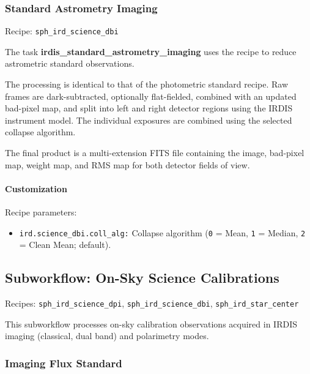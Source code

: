 \subsubsection{Standard Astrometry Imaging}

Recipe: \texttt{sph\_ird\_science\_dbi}

The task \textbf{irdis\_standard\_astrometry\_imaging} uses the recipe to reduce astrometric standard observations.

The processing is identical to that of the photometric standard recipe. Raw
frames are dark-subtracted, optionally flat-fielded, combined with an updated
bad-pixel map, and split into left and right detector regions using the IRDIS
instrument model. The individual exposures are combined using the selected
collapse algorithm.

The final product is a multi-extension FITS file containing the image,
bad-pixel map, weight map, and RMS map for both detector fields of view.

\paragraph{Customization}

Recipe parameters:

\begin{itemize}

\item \texttt{ird.science\_dbi.coll\_alg:}
Collapse algorithm
(\texttt{0} = Mean,
 \texttt{1} = Median,
 \texttt{2} = Clean Mean; default).

\end{itemize}

\subsection{Subworkflow: On-Sky Science Calibrations}

Recipes: 
\texttt{sph\_ird\_science\_dpi},
\texttt{sph\_ird\_science\_dbi},
\texttt{sph\_ird\_star\_center}

This subworkflow processes on-sky calibration observations acquired in IRDIS
imaging (classical, dual band) and polarimetry modes.

\subsubsection{Imaging Flux Standard}

